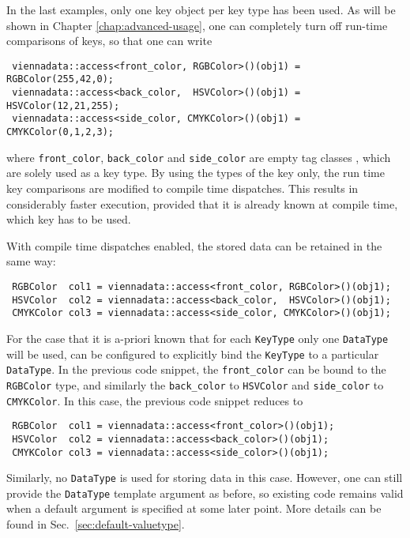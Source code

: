 In the last examples, only one key object per key type has been used. As will be shown in
Chapter \ref{chap:advanced-usage}, one can completely turn off run-time comparisons of keys,
so that one can write
\begin{lstlisting}
 viennadata::access<front_color, RGBColor>()(obj1) = RGBColor(255,42,0);
 viennadata::access<back_color,  HSVColor>()(obj1) = HSVColor(12,21,255);
 viennadata::access<side_color, CMYKColor>()(obj1) = CMYKColor(0,1,2,3);
\end{lstlisting}
where \lstinline|front_color|, \lstinline|back_color| and \lstinline|side_color| are empty tag classes \cite{Alexandrescu:ModernCpp,Vandevoorde:CppTemplates}, which are solely used as a key type.
By using the types of the key only, the run time key comparisons are modified to compile time dispatches. This results in considerably faster
execution, provided that it is already known at compile time, which key has to be used.


With compile time dispatches enabled, the stored data can be retained in the same way:
\begin{lstlisting}
 RGBColor  col1 = viennadata::access<front_color, RGBColor>()(obj1);
 HSVColor  col2 = viennadata::access<back_color,  HSVColor>()(obj1);
 CMYKColor col3 = viennadata::access<side_color, CMYKColor>()(obj1);
\end{lstlisting}
For the case that it is a-priori known that for each \lstinline|KeyType| only one \lstinline|DataType| will be used, {\ViennaData}
can be configured to explicitly bind the \lstinline|KeyType| to a particular \lstinline|DataType|. In the previous code snippet,
the \lstinline|front_color| can be bound to the \lstinline|RGBColor| type, and similarly the \lstinline|back_color| to \lstinline|HSVColor|
and \lstinline|side_color| to \lstinline|CMYKColor|. In this case, the previous code snippet reduces to
\begin{lstlisting}
 RGBColor  col1 = viennadata::access<front_color>()(obj1);
 HSVColor  col2 = viennadata::access<back_color>()(obj1);
 CMYKColor col3 = viennadata::access<side_color>()(obj1);
\end{lstlisting}
Similarly, no \lstinline|DataType| is used for storing data in this case. However, one can still provide the \lstinline|DataType| template argument
as before, so existing code remains valid when a default argument is specified at some later point. More details can be found in Sec.~\ref{sec:default-valuetype}.



